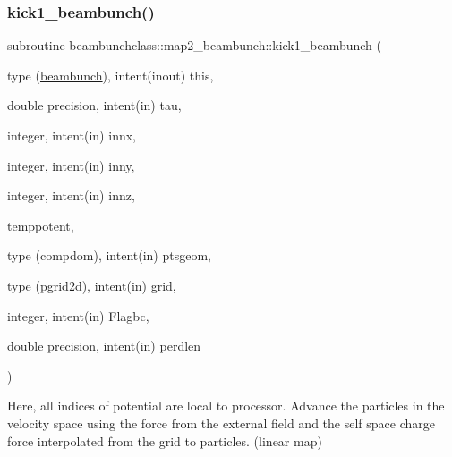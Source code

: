\subsubsection{\texorpdfstring{kick1\_beambunch()}{kick1\_beambunch()}}
{\footnotesize\ttfamily subroutine beambunchclass\+::map2\+\_\+beambunch\+::kick1\+\_\+beambunch (\begin{DoxyParamCaption}\item[{type (\mbox{\hyperlink{namespacebeambunchclass_structbeambunchclass_1_1beambunch}{beambunch}}), intent(inout)}]{this,  }\item[{double precision, intent(in)}]{tau,  }\item[{integer, intent(in)}]{innx,  }\item[{integer, intent(in)}]{inny,  }\item[{integer, intent(in)}]{innz,  }\item[{}]{temppotent,  }\item[{type (compdom), intent(in)}]{ptsgeom,  }\item[{type (pgrid2d), intent(in)}]{grid,  }\item[{integer, intent(in)}]{Flagbc,  }\item[{double precision, intent(in)}]{perdlen }\end{DoxyParamCaption})}



Here, all indices of potential are local to processor. Advance the particles in the velocity space using the force from the external field and the self space charge force interpolated from the grid to particles. (linear map) 

\mbox{\label{interfacebeambunchclass_1_1map2__beambunch_ad5a7cb4186086859c10a4ac8a1ad1fe8}} 
